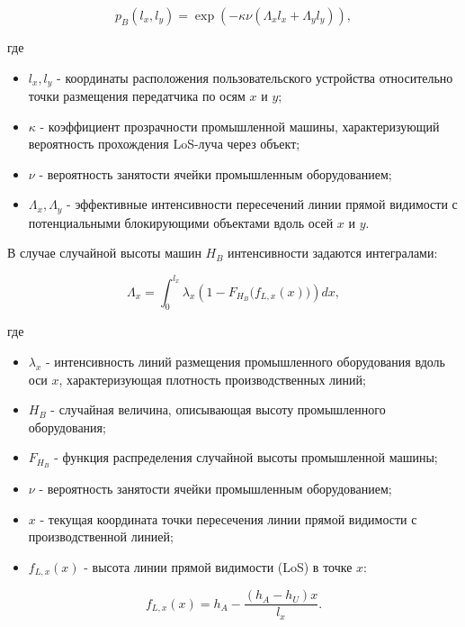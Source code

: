 \documentclass[%
]{ittmm}
\begin{document}
\begin{equation}
p_B(l_x,l_y)=\exp\left(-\kappa \nu (\Lambda_x l_x + \Lambda_y l_y)\right),
\end{equation}

где

\begin{itemize}
  \item $l_x, l_y$ - координаты расположения пользовательского устройства относительно точки размещения передатчика по осям $x$ и $y$;
  \item $\kappa$ - коэффициент прозрачности промышленной машины, характеризующий вероятность прохождения LoS-луча через объект;
  \item $\nu$ - вероятность занятости ячейки промышленным оборудованием;
  \item $\Lambda_x, \Lambda_y$ - эффективные интенсивности пересечений линии прямой видимости с потенциальными блокирующими объектами вдоль осей $x$ и $y$.
\end{itemize}

В случае случайной высоты машин $H_B$ интенсивности задаются интегралами:

\begin{equation}
\Lambda_x=\int_0^{l_x} 
\lambda_x 
\left(
1-F_{H_B}\big(f_{L,x}(x)\big)
\right) 
dx,
\end{equation}

где 

\begin{itemize}
  \item $\lambda_x$ - интенсивность линий размещения промышленного оборудования вдоль оси $x$, характеризующая плотность производственных линий;
  \item $H_B$ - случайная величина, описывающая высоту промышленного оборудования;
  \item $F_{H_B}$ - функция распределения случайной высоты промышленной машины;
  \item $\nu$ - вероятность занятости ячейки промышленным оборудованием;
  \item $x$ - текущая координата точки пересечения линии прямой видимости с производственной линией;
  \item $f_{L,x}(x)$ - высота линии прямой видимости (LoS) в точке $x$: 
\end{itemize}

\begin{equation}
f_{L,x}(x)=h_A-\frac{(h_A-h_U)x}{l_x}.
\end{equation}
\end{document}
